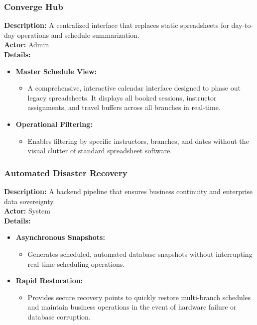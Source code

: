 \subsubsection{Converge Hub}
\textbf{Description:} A centralized interface that replaces static spreadsheets for day-to-day operations and schedule summarization. \\
\textbf{Actor:} Admin \\
\textbf{Details:}
\begin{itemize}
    \item \textbf{Master Schedule View:}
    \begin{itemize}
        \item A comprehensive, interactive calendar interface designed to phase out legacy spreadsheets. It displays all booked sessions, instructor assignments, and travel buffers across all branches in real-time.
    \end{itemize}
    
    \item \textbf{Operational Filtering:}
    \begin{itemize}
        \item Enables filtering by specific instructors, branches, and dates without the visual clutter of standard spreadsheet software.
    \end{itemize}
\end{itemize}

\subsubsection{Automated Disaster Recovery}
\textbf{Description:} A backend pipeline that ensures business continuity and enterprise data sovereignty. \\
\textbf{Actor:} System \\
\textbf{Details:}
\begin{itemize}
    \item \textbf{Asynchronous Snapshots:}
    \begin{itemize}
        \item Generates scheduled, automated database snapshots without interrupting real-time scheduling operations.
    \end{itemize}
    
    \item \textbf{Rapid Restoration:}
    \begin{itemize}
        \item Provides secure recovery points to quickly restore multi-branch schedules and maintain business operations in the event of hardware failure or database corruption.
    \end{itemize}
\end{itemize}

